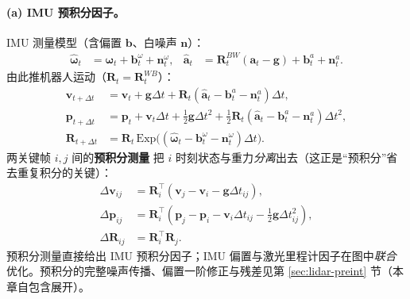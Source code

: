 \paragraph{(a) IMU 预积分因子。}
IMU 测量模型（含偏置 $\mathbf{b}$、白噪声 $\mathbf{n}$）\cite{shan2020liosam}：
\begin{align}
  \hat{\boldsymbol{\omega}}_t&=\boldsymbol{\omega}_t+\mathbf{b}^\omega_t+\mathbf{n}^\omega_t, &
  \hat{\mathbf{a}}_t&=\mathbf{R}^{BW}_t(\mathbf{a}_t-\mathbf{g})+\mathbf{b}^a_t+\mathbf{n}^a_t.
  \label{eq:lidar-imu-meas}
\end{align}
由此推机器人运动（$\mathbf{R}_t=\mathbf{R}^{WB}_t$）：
\begin{align}
  \mathbf{v}_{t+\Delta t}&=\mathbf{v}_t+\mathbf{g}\Delta t+\mathbf{R}_t(\hat{\mathbf{a}}_t-\mathbf{b}^a_t-\mathbf{n}^a_t)\Delta t, \label{eq:lidar-imu-v}\\
  \mathbf{p}_{t+\Delta t}&=\mathbf{p}_t+\mathbf{v}_t\Delta t+\tfrac12\mathbf{g}\Delta t^2+\tfrac12\mathbf{R}_t(\hat{\mathbf{a}}_t-\mathbf{b}^a_t-\mathbf{n}^a_t)\Delta t^2, \label{eq:lidar-imu-p}\\
  \mathbf{R}_{t+\Delta t}&=\mathbf{R}_t\,\mathrm{Exp}\big((\hat{\boldsymbol{\omega}}_t-\mathbf{b}^\omega_t-\mathbf{n}^\omega_t)\Delta t\big). \label{eq:lidar-imu-R}
\end{align}
两关键帧 $i,j$ 间的\textbf{预积分测量}\cite{forster2017preintegration} 把 $i$ 时刻状态与重力\emph{分离}出去（这正是“预积分”省去重复积分的关键）：
\begin{align}
  \Delta\mathbf{v}_{ij}&=\mathbf{R}_i^\top(\mathbf{v}_j-\mathbf{v}_i-\mathbf{g}\Delta t_{ij}), \label{eq:lidar-preint-v}\\
  \Delta\mathbf{p}_{ij}&=\mathbf{R}_i^\top(\mathbf{p}_j-\mathbf{p}_i-\mathbf{v}_i\Delta t_{ij}-\tfrac12\mathbf{g}\Delta t_{ij}^2), \label{eq:lidar-preint-p}\\
  \Delta\mathbf{R}_{ij}&=\mathbf{R}_i^\top\mathbf{R}_j. \label{eq:lidar-preint-R}
\end{align}
预积分测量直接给出 IMU 预积分因子；IMU 偏置与激光里程计因子在图中\emph{联合}优化。预积分的完整噪声传播、偏置一阶修正与残差见第 \ref{sec:lidar-preint} 节（本章自包含展开）。

